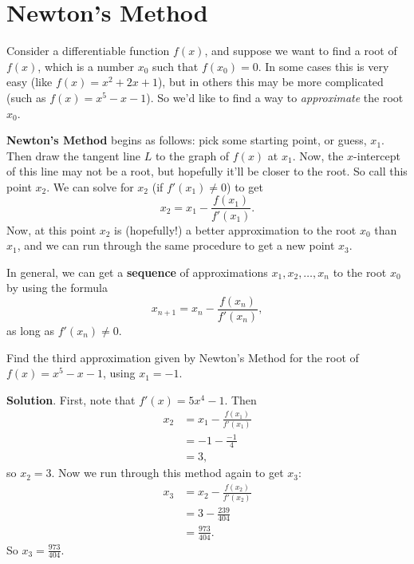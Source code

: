 \documentclass[10pt,]{book}
\newcommand{\terminology}[1]{\textbf{#1}}
\theoremstyle{ptxplainnotitle}
\theoremstyle{ptxplaintitle}
\theoremstyle{ptxplainnotitle}
\theoremstyle{ptxplaintitle}
\theoremstyle{ptxplainnotitle}
\theoremstyle{ptxplaintitle}
\theoremstyle{ptxdefinitionnotitle}
\theoremstyle{ptxdefinitiontitle}
\theoremstyle{ptxdefinitionnotitle}
\theoremstyle{ptxdefinitiontitle}
\theoremstyle{ptxdefinitionnotitle}
\theoremstyle{ptxdefinitiontitle}
\theoremstyle{ptxdefinitionnotitle}
\theoremstyle{ptxdefinitiontitle}
\theoremstyle{ptxdefinitionnotitle}
\theoremstyle{ptxdefinitiontitle}
\numberwithin{equation}{section}
\begin{document}
\section[{Newton's Method}]{Newton's Method}\label{section-newton-s-method}
\hypertarget{p-366}{}%
Consider a differentiable function \(f(x)\), and suppose we want to find a root of \(f(x)\), which is a number \(x_{0}\) such that \(f(x_{0}) = 0\). In some cases this is very easy (like \(f(x) = x^{2} + 2x + 1\)), but in others this may be more complicated (such as \(f(x) = x^{5} - x  - 1\)). So we'd like to find a way to \emph{approximate} the root \(x_{0}\).%
\par
\hypertarget{p-367}{}%
\terminology{Newton's Method} begins as follows: pick some starting point, or guess, \(x_{1}\). Then draw the tangent line \(L\) to the graph of \(f(x)\) at \(x_{1}\). Now, the \(x\)-intercept of this line may not be a root, but hopefully it'll be closer to the root. So call this point \(x_{2}\). We can solve for \(x_{2}\) (if \(f'(x_{1})\neq0\)) to get%
\begin{equation*}
x_{2} = x_{1} - \frac{f(x_{1})}{f'(x_{1})}.
\end{equation*}
Now, at this point \(x_{2}\) is (hopefully!) a better approximation to the root \(x_{0}\) than \(x_{1}\), and we can run through the same procedure to get a new point \(x_{3}\).%
\par
\hypertarget{p-368}{}%
In general, we can get a \terminology{sequence} of approximations \(x_{1},x_{2},\ldots,x_{n}\) to the root \(x_{0}\) by using the formula%
\begin{equation*}
x_{n+1} = x_{n} - \frac{f(x_{n})}{f'(x_{n})},
\end{equation*}
as long as \(f'(x_{n}) \neq0\).%
\begin{example}\label{example-approximating-a-root}
\hypertarget{p-369}{}%
Find the third approximation given by Newton's Method for the root of \(f(x) = x^{5} - x - 1\), using \(x_{1} = -1\).%
\par\smallskip%
\noindent\textbf{Solution}.\hypertarget{solution-81}{}\quad%
\hypertarget{p-370}{}%
First, note that \(f'(x) = 5x^{4} - 1\). Then%
\begin{align*}
x_{2} & = x_{1} - \frac{f(x_{1})}{f'(x_{1})} \\
& = -1 - \frac{-1}{4} \\
& = 3, 
\end{align*}
so \(x_{2} = 3\). Now we run through this method again to get \(x_{3}\):%
\begin{align*}
x_{3} & = x_{2} - \frac{f(x_{2})}{f'(x_{2})} \\
& = 3 - \frac{239}{404} \\
& = \frac{973}{404}. 
\end{align*}
So \(x_{3} = \frac{973}{404}.\)%
\end{example}
\end{document}
